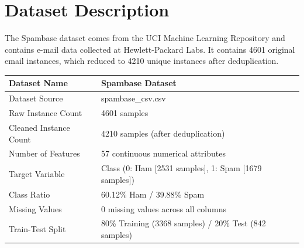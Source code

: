\documentclass[12pt,a4paper]{article}
\begin{document}
\section{Dataset Description}
The Spambase dataset comes from the UCI Machine Learning Repository and contains e-mail data collected at Hewlett-Packard Labs. It contains 4601 original email instances, which reduced to 4210 unique instances after deduplication.

\begin{longtable}{|p{6cm}|p{8cm}|}
\hline
Dataset Name & Spambase Dataset \\ \hline
Dataset Source & spambase\_csv.csv \\ \hline
Raw Instance Count & 4601 samples \\ \hline
Cleaned Instance Count & 4210 samples (after deduplication) \\ \hline
Number of Features & 57 continuous numerical attributes \\ \hline
Target Variable & Class (0: Ham [2531 samples], 1: Spam [1679 samples]) \\ \hline
Class Ratio & 60.12\% Ham / 39.88\% Spam \\ \hline
Missing Values & 0 missing values across all columns \\ \hline
Train-Test Split & 80\% Training (3368 samples) / 20\% Test (842 samples) \\ \hline
\end{longtable}
\end{document}
